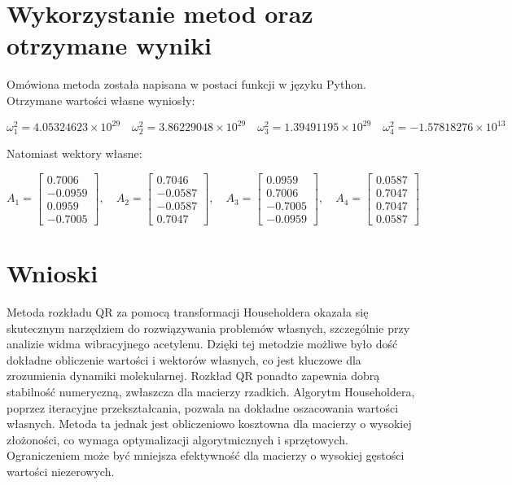 \documentclass{article}
\begin{document}
\section{Wykorzystanie metod oraz otrzymane wyniki}
Omówiona metoda została napisana w postaci funkcji w języku Python. Otrzymane wartości własne wyniosły:

\begin{equation*}
 \omega_1^2 = 4.05324623 \times 10^{29} \quad
 \omega_2^2 = 3.86229048 \times 10^{29} \quad
 \omega_3^2 = 1.39491195 \times 10^{29} \quad
  \omega_4^2 = -1.57818276 \times 10^{13} 
\end{equation*}

\noindent
Natomiast wektory własne:

\begin{equation*}
A_1 = \begin{bmatrix} 0.7006 \\ -0.0959 \\ 0.0959 \\ -0.7005 \end{bmatrix}, \quad
A_2 = \begin{bmatrix} 0.7046 \\ -0.0587 \\ -0.0587 \\ 0.7047 \end{bmatrix}, \quad
A_3 = \begin{bmatrix} 0.0959 \\ 0.7006 \\ -0.7005 \\ -0.0959 \end{bmatrix}, \quad
A_4 = \begin{bmatrix} 0.0587 \\ 0.7047 \\ 0.7047 \\ 0.0587 \end{bmatrix}
\end{equation*}


\section{Wnioski}

Metoda rozkładu QR za pomocą transformacji Householdera okazała się skutecznym narzędziem do rozwiązywania problemów własnych, szczególnie przy analizie widma wibracyjnego acetylenu. Dzięki tej metodzie możliwe było dość dokładne obliczenie wartości i wektorów własnych, co jest kluczowe dla zrozumienia dynamiki molekularnej. Rozkład QR ponadto zapewnia dobrą stabilność numeryczną, zwłaszcza dla macierzy rzadkich. Algorytm Householdera, poprzez iteracyjne przekształcania, pozwala na dokładne oszacowania wartości własnych.
\noindent
Metoda ta jednak jest obliczeniowo kosztowna dla macierzy o wysokiej złożoności, co wymaga optymalizacji algorytmicznych i sprzętowych. Ograniczeniem może być mniejsza efektywność dla macierzy o wysokiej gęstości wartości niezerowych.
\end{document}
